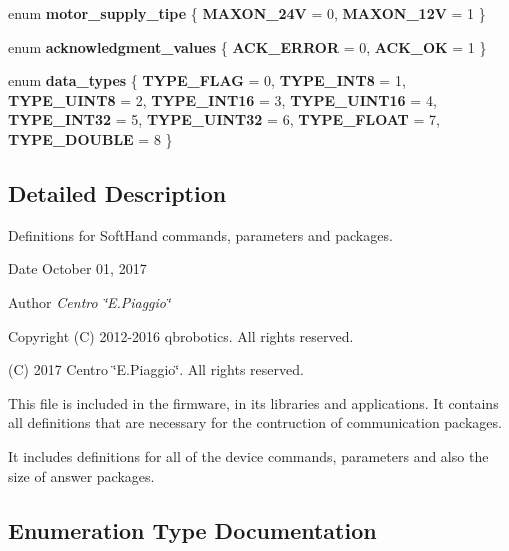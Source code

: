 \begin{DoxyCompactItemize}
\mbox{\label{commands_8h_a17c218160a8b2c5f25db27616793d564}} 
enum {\bfseries motor\+\_\+supply\+\_\+tipe} \{ {\bfseries M\+A\+X\+O\+N\+\_\+24V} = 0, 
{\bfseries M\+A\+X\+O\+N\+\_\+12V} = 1
 \}
\item 
\mbox{\label{commands_8h_a0eae1c82d20671c5d0b9b82b10070f1b}} 
enum {\bfseries acknowledgment\+\_\+values} \{ {\bfseries A\+C\+K\+\_\+\+E\+R\+R\+OR} = 0, 
{\bfseries A\+C\+K\+\_\+\+OK} = 1
 \}
\item 
\mbox{\label{commands_8h_aee7544e5fa6e2843ecdc3609602e56aa}} 
enum {\bfseries data\+\_\+types} \{ \newline
{\bfseries T\+Y\+P\+E\+\_\+\+F\+L\+AG} = 0, 
{\bfseries T\+Y\+P\+E\+\_\+\+I\+N\+T8} = 1, 
{\bfseries T\+Y\+P\+E\+\_\+\+U\+I\+N\+T8} = 2, 
{\bfseries T\+Y\+P\+E\+\_\+\+I\+N\+T16} = 3, 
\newline
{\bfseries T\+Y\+P\+E\+\_\+\+U\+I\+N\+T16} = 4, 
{\bfseries T\+Y\+P\+E\+\_\+\+I\+N\+T32} = 5, 
{\bfseries T\+Y\+P\+E\+\_\+\+U\+I\+N\+T32} = 6, 
{\bfseries T\+Y\+P\+E\+\_\+\+F\+L\+O\+AT} = 7, 
\newline
{\bfseries T\+Y\+P\+E\+\_\+\+D\+O\+U\+B\+LE} = 8
 \}
\end{DoxyCompactItemize}


\subsection{Detailed Description}
Definitions for Soft\+Hand commands, parameters and packages. 

\begin{DoxyDate}{Date}
October 01, 2017 
\end{DoxyDate}
\begin{DoxyAuthor}{Author}
{\itshape Centro \char`\"{}\+E.\+Piaggio\char`\"{}} 
\end{DoxyAuthor}
\begin{DoxyCopyright}{Copyright}
(C) 2012-\/2016 qbrobotics. All rights reserved. 

(C) 2017 Centro \char`\"{}\+E.\+Piaggio\char`\"{}. All rights reserved.
\end{DoxyCopyright}
This file is included in the firmware, in its libraries and applications. It contains all definitions that are necessary for the contruction of communication packages.

It includes definitions for all of the device commands, parameters and also the size of answer packages. 

\subsection{Enumeration Type Documentation}
\mbox{\label{commands_8h_abf0494aabdc65d654a54044eddc9210b}} 
